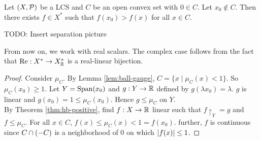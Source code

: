 \documentclass{article}
\begin{document}
\begin{nthm}\label{thm:hb-separation-point}
  Let $(X, \mathcal P)$ be a LCS and $C$ be an open convex set with $0 \in C$. Let $x_0 \nin C$. Then there exists $f \in X^*$ such that $f(x_0) > f(x)$ for all $x \in C$.
\end{nthm}
TODO: Insert separation picture
\begin{rmk}
  From now on, we work with real scalars. The complex case follows from the fact that $\operatorname{Re} : X^* \rightarrow X_\mathbb R^*$ is a real-linear bijection.
\end{rmk}
\begin{proof}
  Consider $\mu_C$. By Lemma \ref{lem:ball-gauge}, $C = \{x \mid \mu_C(x) < 1\}$. So $\mu_C(x_0) \ge 1$. Let $Y = \operatorname{Span}(x_0)$ and $g : Y \rightarrow \mathbb R$ defined by $g(\lambda x_0) = \lambda$. $g$ is linear and $g(x_0) = 1 \le \mu_C(x_0)$. Hence $g \le \mu_C$ on $Y$. \\
  By Theorem \ref{thm:hb-positive}, find $ f : X \rightarrow \mathbb R$ linear such that $f\restriction_Y = g$ and $f \le \mu_C$. For all $x \in C$, $f(x) \le \mu_C(x) < 1 = f(x_0)$. further, $f$ is continuous since $C \cap (-C)$ is a neighborhood of $0$ on which $\left\lvert f(x)\right\rvert \le 1$.
\end{proof}
\end{document}
